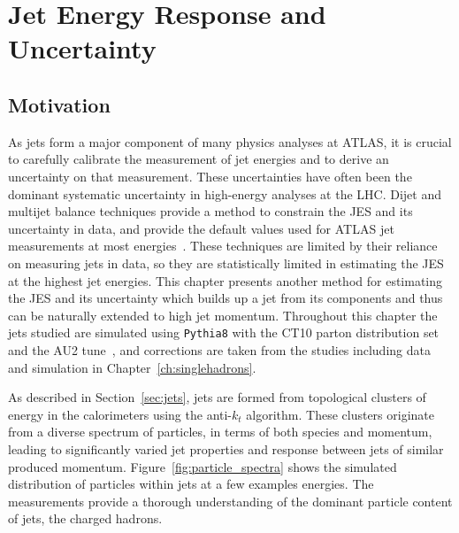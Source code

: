 \chapter{Jet Energy Response and Uncertainty}

\label{ch:jes}

\section{Motivation}

As jets form a major component of many physics analyses at ATLAS, it is crucial to carefully calibrate the measurement of jet energies and to derive an uncertainty on that measurement.
These uncertainties have often been the dominant systematic uncertainty in high-energy analyses at the \ac{LHC}.
Dijet and multijet balance techniques provide a method to constrain the \ac{JES} and its uncertainty in data, and provide the default values used for ATLAS jet measurements at most energies~\cite{PERF-2012-01}.
These techniques are limited by their reliance on measuring jets in data, so they are statistically limited in estimating the \acl{JES} at the highest jet energies.
This chapter presents another method for estimating the \acl{JES} and its uncertainty which builds up a jet from its components and thus can be naturally extended to high jet momentum.
Throughout this chapter the jets studied are simulated using \texttt{Pythia8} with the CT10 parton distribution set~\cite{CTEQ} and the AU2 tune~\cite{AU2}, and corrections are taken from the studies including data and simulation in Chapter~\ref{ch:singlehadrons}. 

As described in Section~\ref{sec:jets}, jets are formed from topological clusters of energy in the calorimeters using the anti-$k_t$ algorithm.
These clusters originate from a diverse spectrum of particles, in terms of both species and momentum, leading to significantly varied jet properties and response between jets of similar produced momentum.
Figure~\ref{fig:particle_spectra} shows the simulated distribution of particles within jets at a few examples energies.
The \ep measurements provide a thorough understanding of the dominant particle content of jets, the charged hadrons. 

